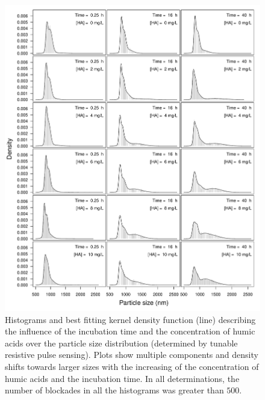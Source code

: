 \documentclass[journal=langd5,manuscript=article]{achemso}
\begin{document}
 \begin{figure}
  \includegraphics[width=\linewidth]{Figures/MCluster_MS_HA_density.pdf}
  \caption{Histograms and best fitting kernel density function (line) describing the influence of the incubation time and the concentration of humic acids over the particle size distribution (determined by tunable resistive pulse sensing). Plots show multiple components and density shifts towards larger sizes with the increasing of the concentration of humic acids and the incubation time. In all determinations, the number of blockades in all the histograms was greater than $500$.} 
  \label{fgr:multiplot_density}
\end{figure}
\end{document}
